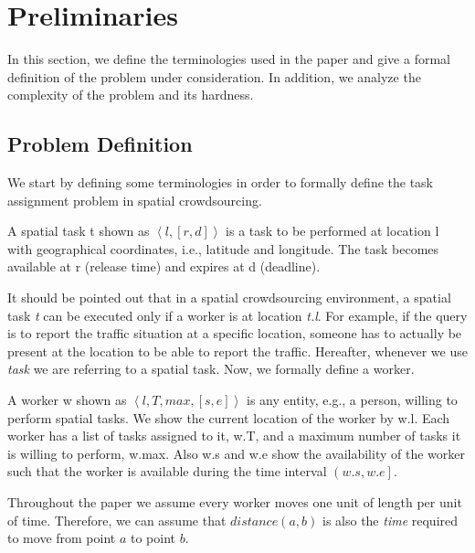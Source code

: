\section{Preliminaries}
\label{sec:prelim}

In this section, we define the terminologies used in the paper and give a formal definition of the problem under consideration. In addition, we analyze the complexity of the problem and its hardness.

\subsection{Problem Definition}
\label{subsec:problemdef}

We start by defining some terminologies in order to formally define the task assignment problem in spatial crowdsourcing.

\begin{definition} 
A spatial task t shown as $\left\langle l, [r, d] \right\rangle$ is a task to be performed at location l with geographical coordinates, i.e., latitude and longitude. The task becomes available at r (release time) and expires at d (deadline).
\end{definition}

It should be pointed out that in a spatial crowdsourcing environment, a spatial task \emph{t} can be executed only if a worker is at location \emph{t.l}. For example, if the query is to report the traffic situation at a specific location, someone has to actually be present at the location to be able to report the traffic. Hereafter, whenever we use \emph{task} we are referring to a spatial task. Now, we formally define a worker.

\begin{definition} [Worker]
A worker w shown as $\left\langle l, T, max, [s, e] \right\rangle$ is any entity, e.g., a person, willing to perform spatial tasks. We show the current location of the worker by w.l. Each worker has a list of tasks assigned to it, w.T, and a maximum number of tasks it is willing to perform, w.max. Also w.s and w.e show the availability of the worker such that the worker is available during the time interval $\left( w.s, w.e \right]$.
\end{definition}

Throughout the paper we assume every worker moves one unit of length per unit of time. Therefore, we can assume that $distance \left( a,b \right)$ is also the \emph{time} required to move from point $a$ to point $b$.

